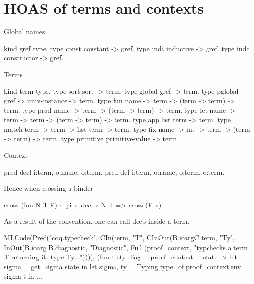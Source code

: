 \documentclass[a4paper, 11pt]{book}
\begin{document}
\section{HOAS of terms and contexts}\label{GALLINA}

Global names

\begin{elpicode}
kind gref type.
type const constant -> gref. %
type indt inductive -> gref. %
type indc constructor -> gref. %
\end{elpicode}

Terms

\begin{elpicode}
kind term type.
type sort  sort -> term. %
type global gref -> term.
type pglobal gref -> univ-instance -> term.
type fun  name -> term -> (term -> term) -> term.         %
type prod name -> term -> (term -> term) -> term.         %
type let  name -> term -> term -> (term -> term) -> term. %
type app   list term -> term.                   %
type match term -> term -> list term -> term.   %
type fix   name -> int -> term -> (term -> term) -> term. %
type primitive primitive-value -> term.
\end{elpicode}

Context

\begin{elpicode}
pred decl i:term, o:name, o:term. %
pred def  i:term, o:name, o:term, o:term. %
\end{elpicode}

Hence when crossing a binder

\begin{elpicode}
cross (fun N T F) :- pi x\ decl x N T => cross (F x).
\end{elpicode}

As a result of the convention, one can call 
deep inside a term.

\begin{ocamlcode}
MLCode(Pred("coq.typecheck",
  CIn(term, "T",
  CInOut(B.ioargC term, "Ty",
  InOut(B.ioarg B.diagnostic, "Diagnostic",
  Full (proof_context, "typchecks a term T returning its type Ty...")))),
(fun t ety diag _ proof_context _ state ->
  let sigma = get_sigma state in
  let sigma, ty = Typing.type_of proof_context.env sigma t in
  ...
\end{ocamlcode}
\end{document}
